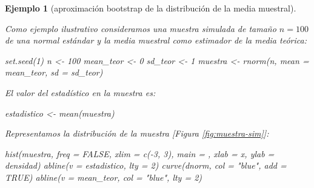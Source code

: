 \documentclass[
]{book}
\newenvironment{Shaded}{\begin{snugshade}}{\end{snugshade}}
\newcommand{\AttributeTok}[1]{\textcolor[rgb]{0.77,0.63,0.00}{#1}}
\newcommand{\ConstantTok}[1]{\textcolor[rgb]{0.00,0.00,0.00}{#1}}
\newcommand{\DecValTok}[1]{\textcolor[rgb]{0.00,0.00,0.81}{#1}}
\newcommand{\FunctionTok}[1]{\textcolor[rgb]{0.00,0.00,0.00}{#1}}
\newcommand{\NormalTok}[1]{#1}
\newcommand{\OtherTok}[1]{\textcolor[rgb]{0.56,0.35,0.01}{#1}}
\newcommand{\SpecialCharTok}[1]{\textcolor[rgb]{0.00,0.00,0.00}{#1}}
\newcommand{\StringTok}[1]{\textcolor[rgb]{0.31,0.60,0.02}{#1}}
\theoremstyle{break}
\newtheorem{example}{Ejemplo}[chapter]
\theoremstyle{nonumberplain}
\begin{document}
\begin{example}[aproximación bootstrap de la distribución de la media muestral]
\protect\hypertarget{exm:mean-boot}{}\label{exm:mean-boot}

Como ejemplo ilustrativo consideramos una muestra simulada de tamaño \(n=100\) de una normal estándar y la media muestral como estimador de la media teórica:

\begin{Shaded}
\begin{Highlighting}[]
\FunctionTok{set.seed}\NormalTok{(}\DecValTok{1}\NormalTok{)}
\NormalTok{n }\OtherTok{\textless{}{-}} \DecValTok{100}
\NormalTok{mean\_teor }\OtherTok{\textless{}{-}} \DecValTok{0}
\NormalTok{sd\_teor }\OtherTok{\textless{}{-}} \DecValTok{1}  
\NormalTok{muestra }\OtherTok{\textless{}{-}} \FunctionTok{rnorm}\NormalTok{(n, }\AttributeTok{mean =}\NormalTok{ mean\_teor, }\AttributeTok{sd =}\NormalTok{ sd\_teor)}
\end{Highlighting}
\end{Shaded}

El valor del estadístico en la muestra es:

\begin{Shaded}
\begin{Highlighting}[]
\NormalTok{estadistico }\OtherTok{\textless{}{-}} \FunctionTok{mean}\NormalTok{(muestra)}
\end{Highlighting}
\end{Shaded}

Representamos la distribución de la muestra {[}Figura \ref{fig:muestra-sim}{]}:

\begin{Shaded}
\begin{Highlighting}[]
\FunctionTok{hist}\NormalTok{(muestra, }\AttributeTok{freq =} \ConstantTok{FALSE}\NormalTok{, }\AttributeTok{xlim =} \FunctionTok{c}\NormalTok{(}\SpecialCharTok{{-}}\DecValTok{3}\NormalTok{, }\DecValTok{3}\NormalTok{),}
     \AttributeTok{main =} \StringTok{\textquotesingle{}\textquotesingle{}}\NormalTok{, }\AttributeTok{xlab =} \StringTok{\textquotesingle{}x\textquotesingle{}}\NormalTok{, }\AttributeTok{ylab =} \StringTok{\textquotesingle{}densidad\textquotesingle{}}\NormalTok{)}
\FunctionTok{abline}\NormalTok{(}\AttributeTok{v =}\NormalTok{ estadistico, }\AttributeTok{lty =} \DecValTok{2}\NormalTok{)}
\FunctionTok{curve}\NormalTok{(dnorm, }\AttributeTok{col =} \StringTok{"blue"}\NormalTok{, }\AttributeTok{add =} \ConstantTok{TRUE}\NormalTok{)}
\FunctionTok{abline}\NormalTok{(}\AttributeTok{v =}\NormalTok{ mean\_teor, }\AttributeTok{col =} \StringTok{"blue"}\NormalTok{, }\AttributeTok{lty =} \DecValTok{2}\NormalTok{)}
\end{Highlighting}
\end{Shaded}


\end{example}
\end{document}
